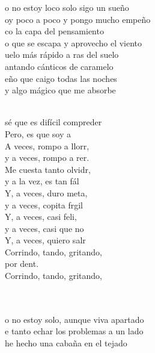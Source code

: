 \begin{cancion}%
	o no estoy loco solo sigo un sueño\\
	oy poco a poco y pongo mucho empeño\\
	co la capa del pensamiento\\
	o que se escapa y aprovecho el viento\\
	uelo más rápido a ras del suelo\\
	antando cánticos de caramelo\\
	eño que caigo todas las noches\\
	y algo mágico que me absorbe\\\jump\\
	\begin{chorus}%
	 sé que es difícil compreder\\
	Pero, es que soy a \\
	A veces, rompo a llorr, \\
	y a veces, rompo a rer. \\
	Me cuesta tanto olvidr, \\
	y a la vez, es tan fál\\
	Y, a veces, duro meta, \\
	y a veces, copita frgil \\
	Y, a veces, casi feli, \\
	y a veces, casi que no\\
	Y, a veces, quiero salr\\
	Corrindo, tando, gritando, \\
	por dent.\\
	Corrindo, tando, gritando,\\
	\end{chorus}%
	\jump\\
	       \\
	o no estoy solo, aunque viva apartado\\
	e tanto echar los problemas a un lado\\
	 he hecho una cabaña en el tejado\\

\end{cancion}

